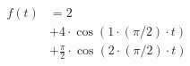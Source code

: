 \begin{center}
\begin{align*}
f(t) &= 2 \\
&+ 4 \cdot \cos( 1 \cdot (\pi/2) \cdot t ) \\
&+ \frac{\pi}{2} \cdot \cos( 2 \cdot (\pi/2) \cdot t )
\end{align*}
\end{center}
